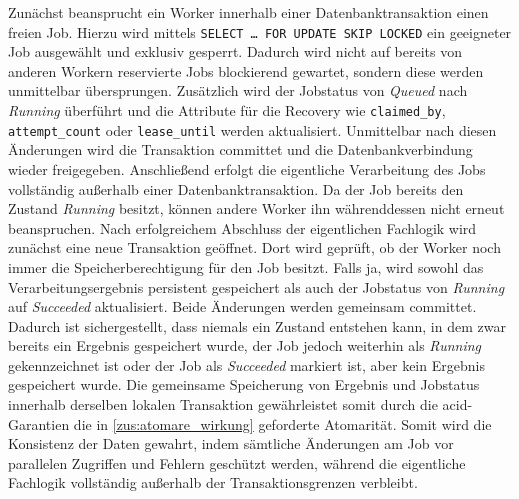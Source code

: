Zunächst beansprucht ein Worker innerhalb einer Datenbanktransaktion einen freien Job.
Hierzu wird mittels \texttt{SELECT~…~FOR~UPDATE~SKIP~LOCKED} ein geeigneter Job ausgewählt und exklusiv gesperrt.
Dadurch wird nicht auf bereits von anderen Workern reservierte Jobs blockierend gewartet, sondern diese werden unmittelbar übersprungen.
Zusätzlich wird der Jobstatus von \textit{Queued} nach \textit{Running} überführt und die Attribute für die Recovery wie
\texttt{claimed\_by}, \texttt{attempt\_count} oder \texttt{lease\_until} werden aktualisiert.
Unmittelbar nach diesen Änderungen wird die Transaktion committet und die Datenbankverbindung wieder freigegeben.
Anschließend erfolgt die eigentliche Verarbeitung des Jobs vollständig außerhalb einer Datenbanktransaktion.
Da der Job bereits den Zustand \textit{Running} besitzt, können andere Worker ihn währenddessen nicht erneut beanspruchen.
Nach erfolgreichem Abschluss der eigentlichen Fachlogik wird zunächst eine neue Transaktion geöffnet.
Dort wird geprüft, ob der Worker noch immer die Speicherberechtigung für den Job besitzt.
Falls ja, wird sowohl das Verarbeitungsergebnis persistent gespeichert als auch der Jobstatus von \textit{Running} auf
\textit{Succeeded} aktualisiert.
Beide Änderungen werden gemeinsam committet.
Dadurch ist sichergestellt, dass niemals ein Zustand entstehen kann, in dem zwar bereits ein Ergebnis gespeichert wurde,
der Job jedoch weiterhin als \textit{Running} gekennzeichnet ist oder der Job als \textit{Succeeded} markiert ist, aber kein
Ergebnis gespeichert wurde.
Die gemeinsame Speicherung von Ergebnis und Jobstatus innerhalb derselben lokalen Transaktion gewährleistet
somit durch die \gls{acid}-Garantien die in \ref{zus:atomare_wirkung} geforderte Atomarität.
Somit wird die Konsistenz der Daten gewahrt, indem sämtliche Änderungen am Job vor parallelen Zugriffen und Fehlern geschützt werden,
während die eigentliche Fachlogik vollständig außerhalb der Transaktionsgrenzen verbleibt.

